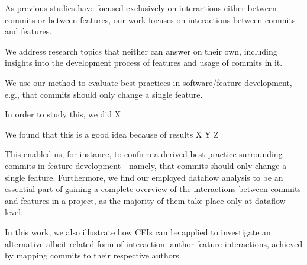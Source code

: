 As previous studies have focused exclusively on interactions either between commits or between features, our work focuses on interactions between commits and features. %

We address research topics that neither can answer on their own, including insights into the development process of features and usage of commits in it. %

We use our method to evaluate best practices in software/feature development, e.g., that commits should only change a single feature.

In order to study this, we did X

We found that this is a good idea because of results X Y Z

This enabled us, for instance, to confirm a derived best practice surrounding commits in feature development - namely, that commits should only change a single feature.
Furthermore, we find our employed dataflow analysis to be an essential part of gaining a complete overview of the interactions between commits and features in a project, as the majority of them take place only at dataflow level.

In this work, we also illustrate how CFIs can be applied to investigate an alternative albeit related form of interaction: author-feature interactions, achieved by mapping commits to their respective authors.




\vfill

\endgroup

\vfill
